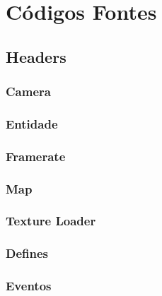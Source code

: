 \section{Códigos Fontes}\label{src}

%
\subsection{Headers}\label{.h}

\subsubsection{Camera}

\subsubsection{Entidade}

\subsubsection{Framerate}

\subsubsection{Map}

\subsubsection{Texture Loader}

\subsubsection{Defines}

\subsubsection{Eventos}

